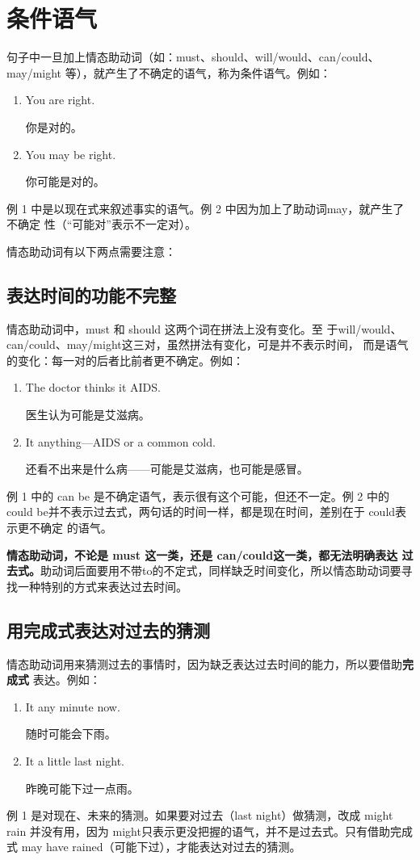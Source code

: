 \section{条件语气}

句子中一旦加上情态助动词（如：must、should、will/would、can/could、may/might
等），就产生了不确定的语气，称为条件语气。例如：
\begin{enumerate}
\item  You are right.

  你是对的。
\item  You may be right.

  你可能是对的。
\end{enumerate}
例 1 中是以现在式来叙述事实的语气。例 2 中因为加上了助动词may，就产生了不确定
性（“可能对”表示不一定对）。

情态助动词有以下两点需要注意：

\subsection{表达时间的功能不完整}

情态助动词中，must 和 should 这两个词在拼法上没有变化。至
于will/would、can/could、may/might这三对，虽然拼法有变化，可是并不表示时间，
而是语气的变化：每一对的后者比前者更不确定。例如：
\begin{enumerate}
\item The doctor thinks it  AIDS.

  医生认为可能是艾滋病。
\item It  anything---AIDS or a common cold.

  还看不出来是什么病——可能是艾滋病，也可能是感冒。
\end{enumerate}
例 1 中的 can be 是不确定语气，表示很有这个可能，但还不一定。例 2 中的could
be并不表示过去式，两句话的时间一样，都是现在时间，差别在于 could表示更不确定
的语气。

\textbf{情态助动词，不论是 must 这一类，还是 can/could这一类，都无法明确表达
  过去式。}助动词后面要用不带to的不定式，同样缺乏时间变化，所以情态助动词要寻
找一种特别的方式来表达过去时间。

\subsection{用完成式表达对过去的猜测}

情态助动词用来猜测过去的事情时，因为缺乏表达过去时间的能力，所以要借助\textbf{完成式}
表达。例如：
\begin{enumerate}
\item  It  any minute now.

  随时可能会下雨。
\item  It  a little last night.

  昨晚可能下过一点雨。
\end{enumerate}
例 1 是对现在、未来的猜测。如果要对过去（last night）做猜测，改成 might rain
并没有用，因为 might只表示更没把握的语气，并不是过去式。只有借助完成式 may
have rained（可能下过），才能表达对过去的猜测。

